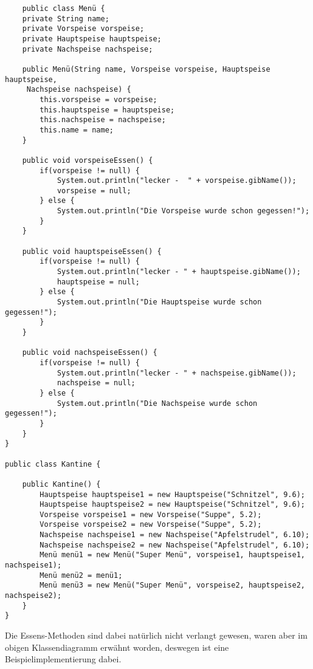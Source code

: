 \documentclass{article}
\begin{document}
\begin{verbatim}
    public class Menü {
    private String name;
    private Vorspeise vorspeise;
    private Hauptspeise hauptspeise;
    private Nachspeise nachspeise;
    
    public Menü(String name, Vorspeise vorspeise, Hauptspeise hauptspeise,
     Nachspeise nachspeise) {
        this.vorspeise = vorspeise;
        this.hauptspeise = hauptspeise;
        this.nachspeise = nachspeise;
        this.name = name;
    }
    
    public void vorspeiseEssen() {
        if(vorspeise != null) {
            System.out.println("lecker -  " + vorspeise.gibName());
            vorspeise = null;
        } else {
            System.out.println("Die Vorspeise wurde schon gegessen!");
        }
    }
    
    public void hauptspeiseEssen() {
        if(vorspeise != null) {
            System.out.println("lecker - " + hauptspeise.gibName());
            hauptspeise = null;
        } else {
            System.out.println("Die Hauptspeise wurde schon gegessen!");
        }
    }
    
    public void nachspeiseEssen() {
        if(vorspeise != null) {
            System.out.println("lecker - " + nachspeise.gibName());
            nachspeise = null;
        } else {
            System.out.println("Die Nachspeise wurde schon gegessen!");
        }
    }
}

public class Kantine {
    
    public Kantine() {
        Hauptspeise hauptspeise1 = new Hauptspeise("Schnitzel", 9.6);
        Hauptspeise hauptspeise2 = new Hauptspeise("Schnitzel", 9.6);
        Vorspeise vorspeise1 = new Vorspeise("Suppe", 5.2);
        Vorspeise vorspeise2 = new Vorspeise("Suppe", 5.2);
        Nachspeise nachspeise1 = new Nachspeise("Apfelstrudel", 6.10);
        Nachspeise nachspeise2 = new Nachspeise("Apfelstrudel", 6.10);
        Menü menü1 = new Menü("Super Menü", vorspeise1, hauptspeise1, nachspeise1);
        Menü menü2 = menü1;
        Menü menü3 = new Menü("Super Menü", vorspeise2, hauptspeise2, nachspeise2);
    }
}

\end{verbatim}

Die Essens-Methoden sind dabei natürlich nicht verlangt gewesen, waren aber im obigen Klassendiagramm erwähnt worden, deswegen ist eine Beispielimplementierung dabei. 
\end{document}

